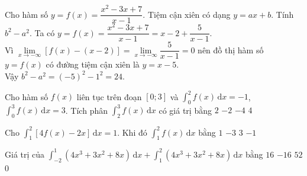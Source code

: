 \begin{bt}%
Cho hàm số $y=f(x)=\dfrac{x^2-3x+7}{x-1}$. Tiệm cận xiên có dạng $y=ax+b$. Tính $b^2-a^2$.
\loigiai
{
Ta có $y=f(x)=\dfrac{x^2-3x+7}{x-1}=x-2+\dfrac{5}{x-1}$. \\
Vì $\lim\limits_{x\to-\infty} [f(x)-(x-2)]=\lim\limits_{x\to-\infty} \dfrac{5}{x-1}=0$ nên đồ thị hàm số $y=f(x)$ có đường tiệm cận xiên là $y=x-5$. \\
Vậy $b^2-a^2=\left(-5\right)^2-1^2=24$.
}
\end{bt}

\begin{ex}%
	Cho hàm số $f(x)$ liên tục trên đoạn $[0;3]$ và $\displaystyle\int_0^2 f(x)\mathrm{\,d}x =-1$, $\displaystyle\int_0^3 f(x)\mathrm{\,d}x =3$. Tích phân $\displaystyle\int_2^3 f(x)\mathrm{\,d}x$  có giá trị bằng
	 \choice
		{$2$} 
		{$-2$} 
		{$-4$} 
		{\True  $4$}
\end{ex}

\begin{ex}%
	Cho $\displaystyle\int_{1}^{2}\left[4f(x)-2x\right]\mathrm{\,d}x=1$. Khi đó $\displaystyle\int_{1}^{2}f(x)\mathrm{\,d}x$ bằng 
	\choice 
		 {\True $1$}
		 {$-3$}
		{$3$} 
		 {$-1$}
\end{ex}

\begin{ex}%
	Giá trị  của $\displaystyle\int_{-2}^{1}(4x^3+3x^2+8x)\mathrm{\,d}x+\displaystyle\int_{1}^{2}(4x^3+3x^2+8x)\mathrm{\,d}x$ bằng
	 \choice
		{\True $16$} 
		 {$-16$}
		 {$52$}
		 {$0$}
\end{ex}

